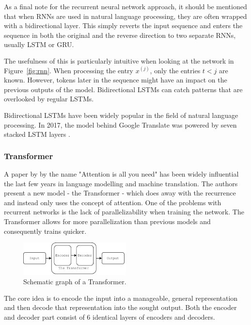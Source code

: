 As a final note for the recurrent neural network approach, it should be mentioned that when RNNs are used in natural language processing, they are often wrapped with a bidirectional layer. This simply reverts the input sequence and enters the sequence in both the original and the reverse direction to two separate RNNs, usually LSTM or GRU. 

The usefulness of this is particularly intuitive when looking at the network in Figure~\ref{fig:rnn}. When processing the entry $x^{(j)}$, only the entries $t < j$ are known. However, tokens later in the sequence might have an impact on the previous outputs of the model. Bidirectional LSTMs can catch patterns that are overlooked by regular LSTMs.

Bidirectional LSTMs have been widely popular in the field of natural language processing. In 2017, the model behind Google Translate was powered by seven stacked LSTM layers \citep{chollet2017deep}. 

\subsubsection{Transformer}

A paper by \citet{NIPS2017_7181} by the name "Attention is all you need" has been widely influential the last few years in language modelling and machine translation. The authors present a new model - the Transformer - which does away with the recurrence and instead only uses the concept of  attention. One of the problems with recurrent networks is the lack of parallelizability when training the network. The Transformer allows for more parallelization than previous models and consequently trains quicker. 

\begin{figure}[H]
    \centering
    \includegraphics[width=0.5\textwidth]{Figures/figs-transformer.pdf}
    \caption{Schematic graph of a Transformer. }
    \label{fig:trfo}
\end{figure}

The core idea is to encode the input into a manageable, general representation and then decode that representation into the sought output. Both the encoder and decoder part consist of 6 identical layers of encoders and decoders.

